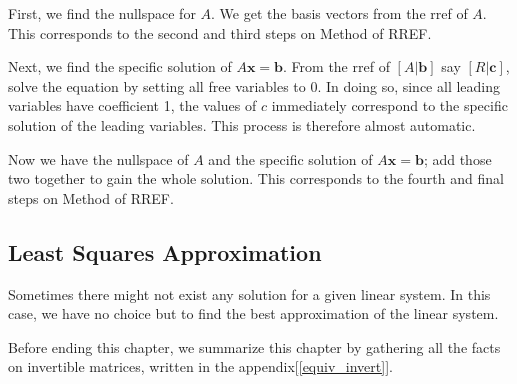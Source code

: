\documentclass{report}
\begin{document}
			First, we find the nullspace for $A$. We get the basis vectors from the rref of $A$. This corresponds to the second and third steps on Method of RREF.
			
			Next, we find the specific solution of $A\bm{x}=\bm{b}$. From the rref of $\left[A|\bm{b}\right]$ say $\left[R|\bm{c}\right]$, solve the equation by setting all free variables to 0. In doing so, since all leading variables have coefficient 1, the values of $c$ immediately correspond to the specific solution of the leading variables. This process is therefore almost automatic.
			
			Now we have the nullspace of $A$ and the specific solution of $A\bm{x}=\bm{b}$; add those two together to gain the whole solution. This corresponds to the fourth and final steps on Method of RREF.
			
		\subsection{Least Squares Approximation}%
			Sometimes there might not exist any solution for a given linear system. In this case, we have no choice but to find the best approximation of the linear system.
		
	
	Before ending this chapter, we summarize this chapter by gathering all the facts on invertible matrices, written in the appendix[\ref{equiv_invert}].
\end{document}
